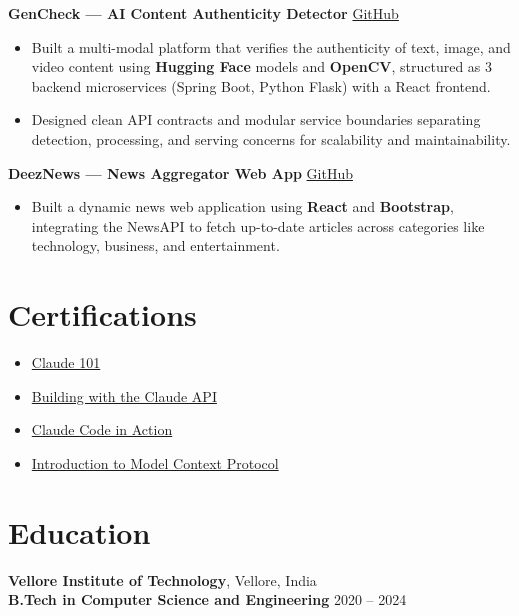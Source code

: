 \documentclass[10pt]{article}
\begin{document}
\textbf{GenCheck — AI Content Authenticity Detector} \hfill \href{https://github.com/GenCheck-Anti-AI}{GitHub}

\begin{itemize}[leftmargin=*, itemsep=2pt]
\item Built a multi-modal platform that verifies the authenticity of text, image, and video content using \textbf{Hugging Face} models and \textbf{OpenCV}, structured as 3 backend microservices (Spring Boot, Python Flask) with a React frontend.
\item Designed clean API contracts and modular service boundaries separating detection, processing, and serving concerns for scalability and maintainability.
\end{itemize}

\vspace{3pt}

\textbf{DeezNews — News Aggregator Web App} \hfill \href{https://github.com/AryanSrivastava673/DeezNews-Web-Application}{GitHub}

\begin{itemize}[leftmargin=*, itemsep=2pt]
\item Built a dynamic news web application using \textbf{React} and \textbf{Bootstrap}, integrating the NewsAPI to fetch up-to-date articles across categories like technology, business, and entertainment.
\end{itemize}

\section*{Certifications}

\begin{itemize}[leftmargin=*, itemsep=2pt]
\item \href{https://verify.skilljar.com/c/ntwcqez43qw2}{Claude 101}
\item \href{https://verify.skilljar.com/c/de5d5kecwqm9}{Building with the Claude API}
\item \href{https://verify.skilljar.com/c/oxgyk8vd95fr}{Claude Code in Action}
\item \href{https://verify.skilljar.com/c/i8busxw5r9i2}{Introduction to Model Context Protocol}
\end{itemize}

\section*{Education}
\vspace{4pt}
\textbf{Vellore Institute of Technology}, Vellore, India \\
\textbf{B.Tech in Computer Science and Engineering} \hfill 2020 -- 2024
\end{document}
